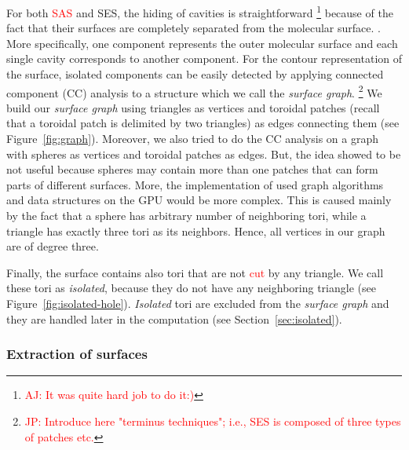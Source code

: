 For both \textcolor{red}{SAS} and SES, the hiding of cavities is straightforward \footnote{\textcolor{red}{AJ: It was quite hard job to do it:)}} because of the fact that their surfaces are completely separated from the molecular surface. \textcolor{red}{\cite{borland2011ambient}}.
More specifically, one component represents the outer molecular surface and each single cavity corresponds to another component.
For the contour representation of the surface, isolated components can be easily detected by applying connected component (CC) analysis to a structure which we call the \textit{surface graph}.
\footnote{\textcolor{red}{JP: Introduce here "terminus techniques"; i.e., SES is composed of three types of patches etc.}}
We build our \textit{surface graph} using triangles as vertices and toroidal patches (recall that a toroidal patch is delimited by two triangles) as edges connecting them (see Figure~\ref{fig:graph}).
Moreover, we also tried to do the CC analysis on a graph with spheres as vertices and toroidal patches as edges.
But, the idea showed to be not useful because spheres may contain more than one patches that can form parts of different surfaces.
More, the implementation of used graph algorithms and data structures on the GPU would be more complex.
This is caused mainly by the fact that a sphere has arbitrary number of neighboring tori, while a triangle has exactly three tori as its neighbors.
Hence, all vertices in our graph are of degree three.

Finally, the surface contains also tori that are not \textcolor{red}{cut} by any triangle.
We call these tori as \textit{isolated}, because they do not have any neighboring triangle (see Figure~\ref{fig:isolated-hole}).
\textit{Isolated} tori are excluded from the \textit{surface graph} and they are handled later in the computation (see Section~\ref{sec:isolated}).

\subsubsection{Extraction of surfaces}

